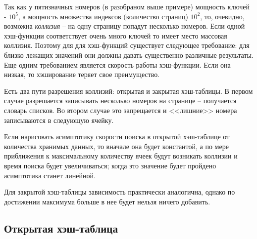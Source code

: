 \documentclass[a4paper, fleqn]{article}
\begin{document}
Так как у пятизначных номеров (в разобраном выше примере) мощность ключей - $10^5$, а мощность множества индексов (количество страниц) $10^2$, то, очевидно, возможна \emph{коллизия} -- на одну страницу попадут несколько номеров.
Если одной хэш-функции соответствует очень много ключей то имеет место массовая коллизия. Поэтому для для хэш-функций существует следующее требование: для близко лежащих значений они должны давать существенно различные результаты. Еще одним требованием является скорость работы хэш-функции. Если она низкая, то хэширование теряет свое преимущество. 

Есть два пути разрешения коллизий: открытая и закрытая хэш-таблицы. В первом случае разрешается записывать несколько номеров на странице -- получается словарь списков. Во втором случае это запрещается и <<лишние>> номера записываются в следующую ячейку. 

Если нарисовать асимптотику скорости поиска в открытой хэш-таблице от количества хранимых данных, то вначале она будет константой, а по мере приближения к максимальному количеству ячеек будут возникать коллизии и время поиска будет увеличиваться; когда это значение будет пройдено асимптотика станет линейной.  

Для закрытой хэш-таблицы зависимость практически аналогична, однако по достижении максимума больше в нее будет нельзя ничего добавить.

\subsection*{Открытая хэш-таблица}
\end{document}
